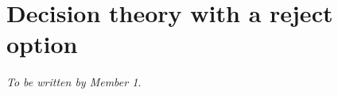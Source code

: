 \section{Decision theory with a reject option}
\label{sec:decision}
\emph{To be written by Member 1.}
